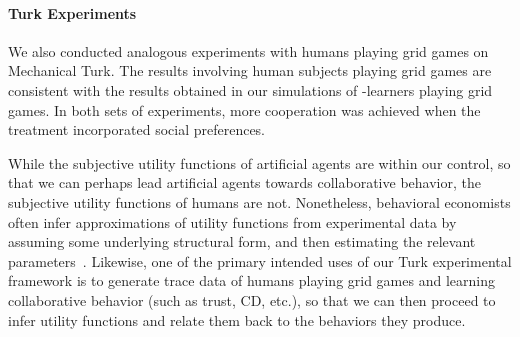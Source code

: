 
\vspace{\up}
\paragraph{Turk Experiments}
\label{sec:human}

We also conducted analogous experiments with humans playing grid games
on Mechanical Turk.
%
%
The results involving human subjects playing grid games are consistent
with the results obtained in our simulations of \Q-learners playing
grid games.  In both sets of experiments, more cooperation was
achieved when the treatment incorporated social preferences.

While the subjective utility functions of artificial agents are within
our control, so that we can perhaps lead artificial agents towards
collaborative behavior, the subjective utility functions of humans are
not.  Nonetheless, behavioral economists often infer approximations of
utility functions from experimental data by assuming some underlying
structural form, and then estimating the relevant
parameters~\cite{blanco11,fisman07}.
Likewise, one of the primary intended uses of our Turk experimental
framework is to generate trace data of humans playing grid games and
learning collaborative behavior (such as trust, CD, etc.), so that we
can then proceed to infer utility functions and relate them back to
the behaviors they produce.

